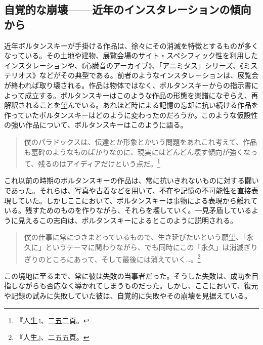 \documentclass[b5j,twoside,twocolumn]{utarticle}
\newcommand{\mysubsection}[1]{\vspace{-6mm}\subsection{#1}\vspace{-2mm}}
\begin{document}
\mysubsection{\tbaselineshift =3.0pt 自覚的な崩壊------近年のインスタレーションの傾向から}
近年ボルタンスキーが手掛ける作品は、徐々にその消滅を特徴とするものが多くなっている。その土地や建物、展覧会場のサイト・スペシフィック性を利用したインスタレーションや、《心臓音のアーカイブ》、「アニミタス」シリーズ、《ミステリオス》などがその典型である。前者のようなインスタレーションは、展覧会が終われば取り壊される。作品は物体ではなく、ボルタンスキーからの指示書によって成立する。ボルタンスキーはこのような作品の形態を楽譜になぞらえ、再解釈されることを望んでいる。あれほど時による記憶の忘却に抗い続ける作品を作っていたボルタンスキーはどのように変わったのだろうか。このような仮設性の強い作品について、ボルタンスキーはこのように語る。

\begin{quote}
僕のパラドックスは、伝達とか形象とかいう問題をあれこれ考えて、作品も墓碑のようなものばかりなのに、現実にはどんどん壊す傾向が強くなって、残るのはアイディアだけという点だ。\footnote{『人生』、二五二頁。}
\end{quote}


これ以前の時期のボルタンスキーの作品は、常に抗いきれないものに対する闘いであった。それらは、写真や古着などを用いて、不在や記憶の不可能性を直接表現していた。しかしここにおいて、ボルタンスキーは事物による表現から離れている。残すためのものを作りながら、それらを壊していく。一見矛盾しているように見えるこの志向は、ボルタンスキーによるとこのように説明される。


\begin{quote}
僕の仕事に常につきまとっているもので、生き延びたいという願望、「永久に」というテーマに関わりながら、でも同時にこの「永久」は消滅ぎりぎりのところにあって、そして最後には消えていく…。\footnote{『人生』、二五五頁。}
\end{quote}


この境地に至るまで、常に彼は失敗の当事者だった。そうした失敗は、成功を目指しながらも否応なく導かれてしまうものだった。しかし、ここにおいて、復元や記録の試みに失敗していた彼は、自覚的に失敗やその崩壊を見据えている。
\end{document}
